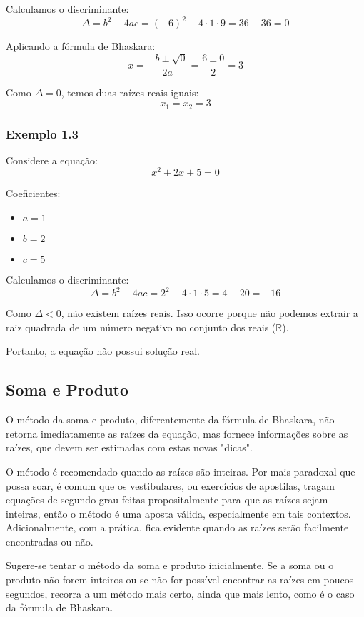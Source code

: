 \documentclass[12pt]{report}
\newcommand{\1}{\faThermometerEmpty}
\newcommand{\2}{\faThermometerQuarter}
\newcommand{\3}{\faThermometerHalf}
\newcommand{\4}{\faThermometerThreeQuarters}
\newcommand{\5}{\faThermometerFull}
\begin{document}
Calculamos o discriminante:
$$ \Delta = b^2 - 4ac = (-6)^2 - 4 \cdot 1 \cdot 9 = 36 - 36 = 0 $$

Aplicando a fórmula de Bhaskara:
$$
x = \frac{-b \pm \sqrt{0}}{2a} = \frac{6 \pm 0}{2} = 3
$$

Como $\Delta = 0$, temos duas raízes reais iguais:
\[
x_1 = x_2 = 3
\]



\subsubsection*{Exemplo 1.3}

Considere a equação:
$$ x^2 + 2x + 5 = 0 $$

Coeficientes:
\begin{itemize}
    \item $a = 1$
    \item $b = 2$
    \item $c = 5$
\end{itemize}

Calculamos o discriminante:
$$ \Delta = b^2 - 4ac = 2^2 - 4 \cdot 1 \cdot 5 = 4 - 20 = -16 $$

Como $\Delta < 0$, não existem raízes reais. Isso ocorre porque não podemos extrair a raiz quadrada de um número negativo no conjunto dos reais ($\mathbb{R}$).

Portanto, a equação não possui solução real.



\subsection*{Soma e Produto}
O método da soma e produto, diferentemente da fórmula de Bhaskara, não retorna imediatamente as raízes da equação, mas fornece informações sobre as raízes, que devem ser estimadas com estas novas "dicas".

O método é recomendado quando as raízes são inteiras. Por mais paradoxal que possa soar, é comum que os vestibulares, ou exercícios de apostilas, tragam equações de segundo grau feitas propositalmente para que as raízes sejam inteiras, então o método é uma aposta válida, especialmente em tais contextos. Adicionalmente, com a prática, fica evidente quando as raízes serão facilmente encontradas ou não.

Sugere-se tentar o método da soma e produto inicialmente. Se a soma ou o produto não forem inteiros ou se não for possível encontrar as raízes em poucos segundos, recorra a um método mais certo, ainda que mais lento, como é o caso da fórmula de Bhaskara.
\end{document}

